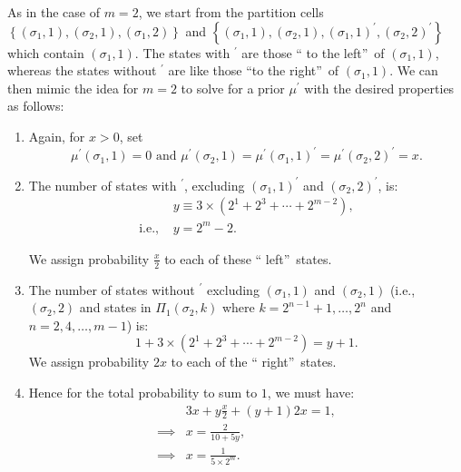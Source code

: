 \documentclass[12pt,reqno]{amsart}
\begin{document}
As in the case of $m=2$, we start from the partition cells $\left\{ \left(
\sigma_{1},1\right) ,\left( \sigma_{2},1\right) ,\left( \sigma_{1},2\right) \right\} $ and $%
\left\{ \left( \sigma_{1},1\right) ,\left( \sigma_{2},1\right) ,\left( \sigma_{1},1\right)
^{\prime },\left( \sigma_{2},2\right) ^{\prime }\right\} $ which contain $\left(
\sigma_{1},1\right) $. The states with $^{\prime }$ are those \textquotedblleft
to the left\textquotedblright\ of $\left( \sigma_{1},1\right) $, whereas the
states without $^{\prime }$ are like those \textquotedblleft to the
right\textquotedblright\ of $\left( \sigma_{1},1\right) $. We can then mimic the
idea for $m=2$ to solve for a prior $\mu ^{\prime }$ with the desired properties as follows:
\begin{enumerate}
\item Again, for $x>0$, set 
\[
\mu ^{\prime }\left( \sigma_{1},1\right) =0\text{ and }\mu ^{\prime }\left(
\sigma_{2},1\right) =\mu ^{\prime }\left( \sigma_{1},1\right) ^{\prime }= \mu
^{\prime }\left( \sigma_{2},2\right) ^{\prime }=x\text{.} 
\]

\item The number of states with $^{\prime }$, excluding $\left(
\sigma_{1},1\right) ^{\prime }$ and $\left( \sigma_{2},2\right) ^{\prime }$, is:
\begin{align*}
&y \equiv 3\times \left( 2^{1}+2^{3}+\cdots +2^{m-2}\right),\\    
\text{i.e., }& y = 2^m -2.
\end{align*}

We assign probability $\tfrac{x}{2}$ to each of these \textquotedblleft
left\textquotedblright\ states.

\item The number of states without $^{\prime }$ excluding $\left(
\sigma_{1},1\right) $ and $\left( \sigma_{2},1\right) $ (i.e., $\left( \sigma_{2},2\right) $
and states in $\Pi _{1}\left( \sigma_{2},k\right) $ where $k=2^{n-1}+1,\ldots,2^{n}$
and $n=2,4,\ldots,m-1$) is: 
\[
1+3\times \left( 2^{1}+2^{3}+\cdots +2^{m-2}\right)= y +1 \text{.} 
\]
We assign probability $2x$ to each of the \textquotedblleft
right\textquotedblright\ states.

\item Hence for the total probability to sum to $1$, we must have:
\begin{align*}
&3x + y \frac{x}{2} + (y+1) 2x = 1,\\
\implies & x = \frac{2}{10 + 5y} ,\\
\implies &x=\frac{1}{5\times2^{m}}\text{.} 
\end{align*}
\end{enumerate}
\end{document}
